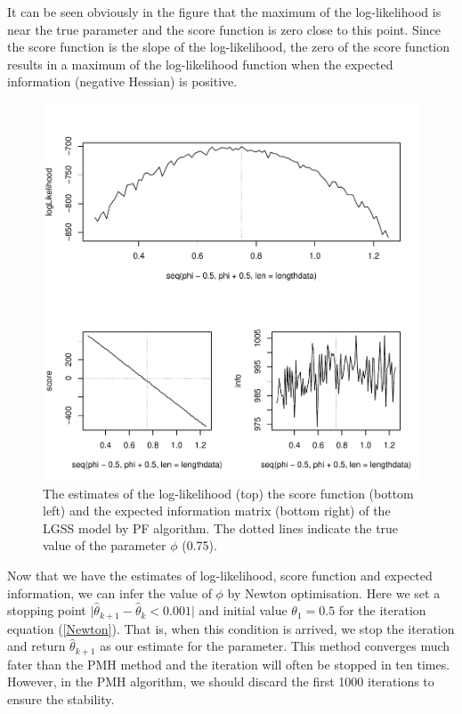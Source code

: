 \documentclass[mstat,12pt]{unswthesis}  %
\numberwithin{equation}{section}
\begin{document}
\noindent It can be seen obviously in the figure that the  maximum of the log-likelihood is near the true parameter
and  the score function is zero close to
this point.
Since the score function is the slope of the log-likelihood,
the zero of the score function results in a maximum of the
log-likelihood function when the expected information (negative Hessian) is positive.

\begin{figure}[H]
    \centering
    \includegraphics[width=1.0\linewidth]{score_lgss.pdf}
    \caption
    {The estimates of the log-likelihood (top) the score
    function (bottom left) and the expected information matrix (bottom right) of the
    LGSS model by PF algorithm. The dotted lines indicate the true value of the parameter $\phi$ (0.75).}
    \label{fig:score_lgss}
\end{figure}

\noindent Now that we have the estimates of log-likelihood, score function and expected information, we can infer the value of $\phi$ by Newton optimisation.
Here we set a stopping point $\lvert\widehat{\theta}_{k+1}-\widehat{\theta}_{k} < 0.001 \rvert$  and initial value $\theta_{1}=0.5$ for the iteration equation (\ref{Newton}).
That is, when this condition is arrived, we stop the iteration and return $\widehat{\theta}_{k+1}$ as our estimate for the parameter. This method converges much fater than the PMH method  and the iteration will often be stopped in ten times.  
However, in the PMH algorithm, we should discard the first 1000 iterations to ensure the stability.\\
\end{document}

